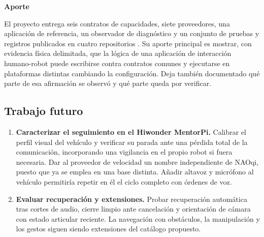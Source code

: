 \documentclass[11pt,letterpaper]{article}
\begin{document}
\par\medskip\noindent\textbf{Aporte}\par

El proyecto entrega seis contratos de capacidades, siete proveedores, una aplicación de referencia, un observador de diagnóstico y un conjunto de pruebas y registros publicados en cuatro repositorios \cite{repodocs,repointerfaces,repoproviders,reposystem}. Su aporte principal es mostrar, con evidencia física delimitada, que la lógica de una aplicación de interacción humano-robot puede escribirse contra contratos comunes y ejecutarse en plataformas distintas cambiando la configuración. Deja también documentado qué parte de esa afirmación se observó y qué parte queda por verificar.

\subsection{Trabajo futuro}
\begin{enumerate}
\item \textbf{Caracterizar el seguimiento en el Hiwonder MentorPi.} Calibrar el perfil visual del vehículo y verificar su parada ante una pérdida total de la comunicación, incorporando una vigilancia en el propio robot si fuera necesaria. Dar al proveedor de velocidad un nombre independiente de NAOqi, puesto que ya se emplea en una base distinta. Añadir altavoz y micrófono al vehículo permitiría repetir en él el ciclo completo con órdenes de voz.
\item \textbf{Evaluar recuperación y extensiones.} Probar recuperación automática tras cortes de audio, cierre limpio ante cancelación y orientación de cámara con estado articular reciente. La navegación con obstáculos, la manipulación y los gestos siguen siendo extensiones del catálogo propuesto.
\end{enumerate}
\end{document}
